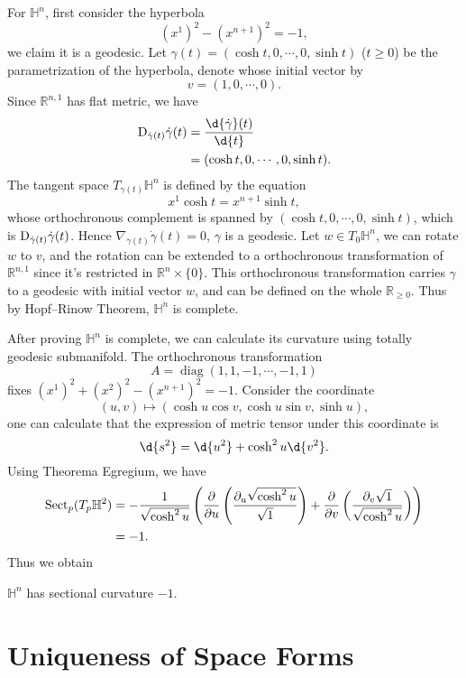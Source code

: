 For $\mathbb{H}^n$, first consider the hyperbola
\[(x^1)^2-(x^{n+1})^2=-1,\]
we claim it is a geodesic.
Let $\gamma(t)=(\cosh{t},0,\cdots,0,\sinh{t})$ ($t\geq 0$) be the parametrization of the hyperbola, denote whose initial vector by 
\[v=(1,0,\cdots,0).\]
Since $\mathbb{R}^{n,1}$ has flat metric, we have
\begin{align*}
    \D_{\dot\gamma(t)}\dot\gamma(t)&=\frac{\d{\dot\gamma}(t)}{\d{t}}\\
    &=(\cosh{t},0,\cdots,0,\sinh{t}).
\end{align*}
The tangent space $T_{\gamma(t)}\mathbb{H}^n$ is defined by the equation
\[x^1\cosh{t}=x^{n+1}\sinh{t},\]
whose orthochronous complement is spanned by $(\cosh{t},0,\cdots,0,\sinh{t})$, which is $\mathrm{D}_{\dot\gamma(t)}\dot\gamma(t)$.
Hence $\nabla_{\dot\gamma(t)}\dot\gamma(t)=0$, $\gamma$ is a geodesic.
Let $w\in T_0\mathbb{H}^n$, we can rotate $w$ to $v$, and the rotation can be extended to a orthochronous transformation of $\mathbb{R}^{n,1}$ since it's restricted in $\mathbb{R}^n\times\{0\}$.
This orthochronous transformation carries $\gamma$ to a geodesic with initial vector $w$, and can be defined on the whole $\mathbb{R}_{\geq 0}$.
Thus by Hopf--Rinow Theorem, $\mathbb{H}^n$ is complete.

After proving $\mathbb{H}^n$ is complete, we can calculate its curvature using totally geodesic submanifold.
The orthochronous transformation
\[A=\operatorname{diag}(1,1,-1,\cdots,-1,1)\]
fixes $(x^1)^2+(x^2)^2-(x^{n+1})^2=-1$.
Consider the coordinate
\[(u,v)\mapsto(\cosh{u}\cos{v},\cosh{u}\sin{v},\sinh{u}),\]
one can calculate that the expression of metric tensor under this coordinate is
\[\d{s^2}=\d{u^2}+\cosh^2{u}\d{v^2}.\]
Using Theorema Egregium, we have
\begin{align*}
    \operatorname{Sect}_p(T_p\mathbb{H}^2)&=-\frac{1}{\sqrt{\cosh^2{u}}}\left(\frac{\partial{}}{\partial{u}}\left(\frac{\partial_u\sqrt{\cosh^2{u}}}{\sqrt{1}}\right)+\frac{\partial{}}{\partial{v}}\left(\frac{\partial_v\sqrt{1}}{\sqrt{\cosh^2{u}}}\right)\right)\\
    &=-1.
\end{align*}
Thus we obtain
\begin{prop}
    $\mathbb{H}^n$ has sectional curvature $-1$.
\end{prop}

\section{Uniqueness of Space Forms}

